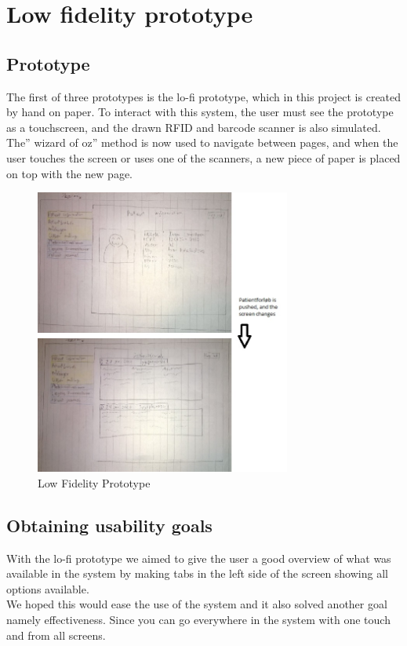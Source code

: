 \chapter{Low fidelity prototype}

\section{Prototype}
The first of three prototypes is the lo-fi prototype, which in this project is created by hand on paper. To interact with this system, the user must see the prototype as a touchscreen, and the drawn RFID and barcode scanner is also simulated. The” wizard of oz” method is now used to navigate between pages, and when the user touches the screen or uses one of the scanners, a new piece of paper is placed on top with the new page. \\
\begin{figure}[H]
\centering
\includegraphics[width=0.75\textwidth]{billeder/lofi}
\caption{Low Fidelity Prototype}
\end{figure}
\section{Obtaining usability goals}
With the lo-fi prototype we aimed to give the user a good overview of what was available in the system by making tabs in the left side of the screen showing all options available.\\
We hoped this would ease the use of the system and it also solved another goal namely effectiveness. Since you can go everywhere in the system with one touch and from all screens.\\
